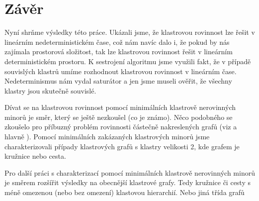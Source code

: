 \chapter{Závěr}

Nyní shrňme výsledky této práce. Ukázali jsme, že klastrovou rovinnost lze řešit v lineárním nedeterministickém čase, což nám navíc dalo i, že pokud by nás zajímala prostorová složitost, tak lze klastrovou rovinnost řešit v lineárním deterministickém prostoru.  K sestrojení algoritmu jsme využili fakt, že v případě souvislých klastrů umíme rozhodnout klastrovou rovinnost v lineárním čase. Nedeterminismus nám vydal saturátor a jen jsme museli ověřit, že všechny klastry jsou skutečně souvislé.

Dívat se na klastrovou rovinnost pomocí minimálních klastrově nerovinných minorů je směr, který se ještě nezkoušel (co je známo). Něco podobného se zkoušelo pro příbuzný problém rovinnosti částečně nakreslených grafů (viz \cite{AngeliniEtAl10} a hlavně \cite{JelinekEtAl10}). Pomocí minimálních zakázaných klastrových minorů jsme charakterizovali případy klastrových grafů s klastry velikosti 2, kde grafem je kružnice nebo cesta.

Pro další práci s charakterizací pomocí minimálních klastrově nerovinných minorů je směrem rozšířit výsledky na obecnější klastrové grafy.  Tedy kružnice či cesty s méně omezenou (nebo bez omezení) klastovou hierarchií. Nebo jiná třída grafů